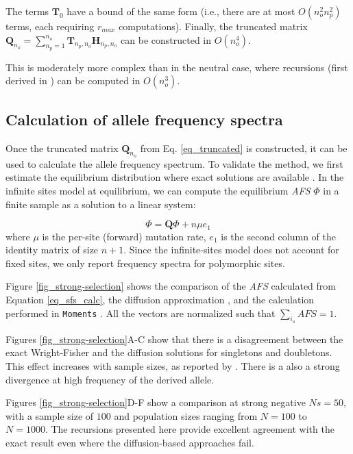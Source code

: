 \documentclass[review]{elsarticle}
\begin{document}
 
 The terms  $\mathbf{T}_{0}$ have a bound of the same form (i.e., there are at most $O(n_o^2 n_p^2)$ terms, each requiring $r_{max}$ computations).  
Finally, the truncated matrix $\mathbf{Q}_{n_o} = \sum_{n_p=1}^{n_{o}} \mathbf{T}_{n_p,n_o} \mathbf{H}_{n_p,n_o}$ can be constructed in $O(n_o^4)$.


This is moderately more complex than in the neutral case, where recursions (first derived in \cite{BhaskarEtAl2014}) can be computed in $O(n_o^3)$.

\subsection{Calculation of allele frequency spectra}
\label{subsec_afs}

Once the truncated matrix
$\mathbf{Q}_{n_o}$ from Eq. \ref{eq_truncated} is constructed, it can be used to calculate the allele frequency spectrum. To
validate the method, we first estimate the equilibrium distribution where exact solutions are available
\citep{Krukov2016}. In the infinite sites model at equilibrium, we can compute the
equilibrium \textit{AFS} $\Phi$ in a finite sample as a solution to a linear system:

\begin{equation}
  \label{eq_sfs_calc}
  \Phi = \mathbf{Q}\Phi  + n \mu e_1
\end{equation}
where $\mu$ is the per-site (forward) mutation rate, $e_1$ is the second column of the identity
matrix of size $n+1.$ Since the infinite-sites model does not account for fixed sites, 
we only report frequency spectra for polymorphic sites.
  
Figure \ref{fig_strong-selection} shows the comparison of the \textit{AFS}
calculated from Equation \ref{eq_sfs_calc}, the diffusion approximation
\cite[eq. 9.23]{Ewens2004}, and the calculation performed in \texttt{Moments}
\citep{JouganousEtAl2017}. All the vectors are normalized such that $\sum_{i_o} \textit{AFS} = 1$.

Figures \ref{fig_strong-selection}A-C show that there is a disagreement between the exact
Wright-Fisher and the diffusion solutions for singletons and doubletons. This effect increases with sample sizes, 
as reported by \citep{BhaskarEtAl2014}. There is a also
a strong divergence at high frequency of the derived allele. %

Figures \ref{fig_strong-selection}D-F show a comparison at strong negative $Ns=50$, with a
sample size of $100$ and population sizes ranging from $N=100$ to  $N=1000.$  
The recursions presented here provide excellent agreement with the exact result even 
where the diffusion-based approaches fail. 
\end{document}
